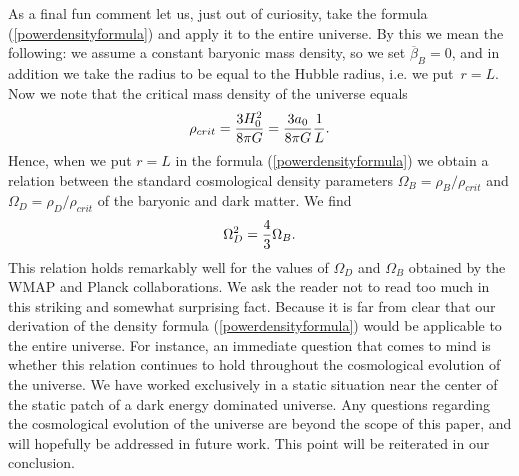 \documentclass[a4paper,12pt]{article}
\begin{document}
As a final fun comment let us, just out of curiosity, take the formula (\ref{powerdensityformula}) and apply it to the entire universe. By this we mean the following: we assume a constant baryonic mass density, so we set $\overline{\beta}_B=0$,  and in addition we take the radius to be equal to the Hubble radius, i.e. we put\ $r=L$.
Now we note that the critical mass density of the universe equals
\begin{equation}
\rho_{crit} =  {3H_0^2\over 8\pi G}= {3a_0\over 8\pi G} {1\over L}  .
\end{equation}
Hence, when we put $r=L$ in the formula (\ref{powerdensityformula}) we obtain a relation between the standard cosmological density parameters $\Omega_{B}=\rho_B/\rho_{crit}$ and $\Omega_{D}=\rho_D/\rho_{crit}$ of the baryonic and dark matter. We find
 \begin{equation}
 \label{Omega-formula}
 \Omega_D^2 = {4\over 3} \Omega_B. 	
 \end{equation}
This relation holds remarkably well for the values of $\Omega_D$ and $\Omega_B$ obtained by the WMAP and Planck collaborations. We ask the reader not to read too much in this striking and somewhat surprising fact. Because it is far from clear that our derivation of the density formula (\ref{powerdensityformula}) would be applicable to the entire universe. For instance, an immediate question that comes to mind is whether this relation continues to hold throughout the cosmological evolution of the universe. We have worked exclusively in a static situation near the center of the static patch of a dark energy dominated universe.  Any questions regarding the cosmological evolution of the universe are beyond the scope of this paper, and will hopefully be addressed in future work. This point will be reiterated in our conclusion. 
 










\end{document}
